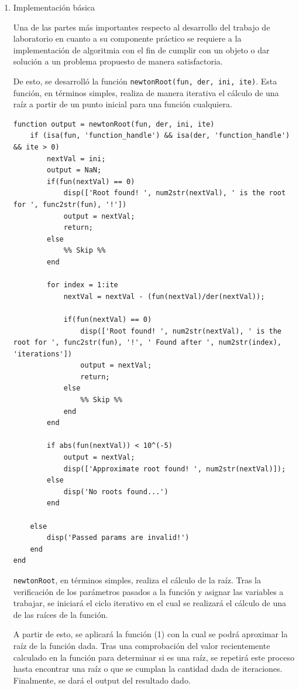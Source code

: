 \documentclass[english,notitlepage,letterpaper, 10pt]{article} %
\begin{document}
  \begin{enumerate}
    \item Implementación básica

    Una de las partes más importantes respecto al desarrollo del trabajo de laboratorio en cuanto a su componente práctico se requiere a la implementación de algoritmia con el fin de cumplir con un objeto o dar solución a un problema propuesto de manera satisfactoria.

    De esto, se desarrolló la función \texttt{newtonRoot(fun, der, ini, ite)}. Esta función, en términos simples, realiza de manera iterativa el cálculo de una raíz a partir de un punto inicial para una función cualquiera. 

    \begin{lstlisting}
function output = newtonRoot(fun, der, ini, ite)
    if (isa(fun, 'function_handle') && isa(der, 'function_handle') && ite > 0)
        nextVal = ini;
        output = NaN;
        if(fun(nextVal) == 0) 
            disp(['Root found! ', num2str(nextVal), ' is the root for ', func2str(fun), '!'])
            output = nextVal;    
            return;
        else
            %% Skip %%
        end
        
        for index = 1:ite
            nextVal = nextVal - (fun(nextVal)/der(nextVal));
            
            if(fun(nextVal) == 0) 
                disp(['Root found! ', num2str(nextVal), ' is the root for ', func2str(fun), '!', ' Found after ', num2str(index), 'iterations'])
                output = nextVal;
                return;
            else
                %% Skip %%
            end
        end

        if abs(fun(nextVal)) < 10^(-5)
            output = nextVal;
            disp(['Approximate root found! ', num2str(nextVal)]);
        else
            disp('No roots found...')
        end

    else
        disp('Passed params are invalid!')
    end
end       
    \end{lstlisting}

    \texttt{newtonRoot}, en términos simples, realiza el cálculo de la raíz. Tras la verificación de los parámetros pasados a la función y asignar las variables a trabajar, se iniciará el ciclo iterativo en el cual se realizará el cálculo de una de las raíces de la función. 

    A partir de esto, se aplicará la función (1) con la cual se podrá aproximar la raíz de la función dada. Tras una comprobación del valor recientemente calculado en la función para determinar si es una raíz, se repetirá este proceso hasta encontrar una raíz o que se cumplan la cantidad dada de iteraciones. Finalmente, se dará el output del resultado dado. 


\end{enumerate}
\end{document}
